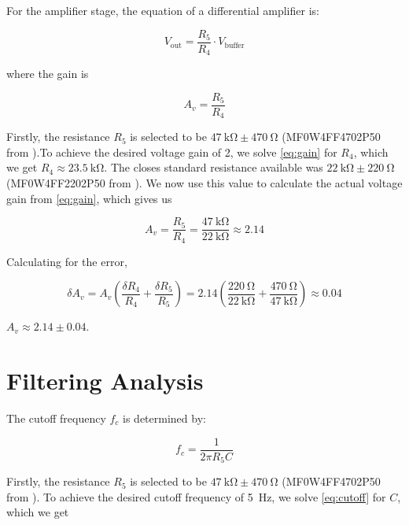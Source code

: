 \documentclass[12pt,a4paper]{article}
\begin{document}
For the amplifier stage, the equation of a differential amplifier is:

\begin{equation}
    V_\text{out} = \frac{R_5}{R_4} \cdot V_\text{buffer}
    \label{eq:vout-to-vbuffer}
\end{equation}

where the gain is

\begin{equation}
    A_v= \frac{R_5}{R_4}
    \label{eq:gain}
\end{equation}

Firstly, the resistance $R_5$ is selected to be $\SI{47}{\kilo\ohm}\pm\SI{470}{\ohm}$ (MF0W4FF4702P50 from \cite{resistor}).To achieve the desired voltage gain of 2, we solve \eqref{eq:gain} for $R_4$, which we get $R_4\approx\SI{23.5}{\kilo\ohm}$. The closes standard resistance available was $\SI{22}{\kilo\ohm}\pm\SI{220}{\ohm}$ (MF0W4FF2202P50 from \cite{resistor}). We now use this value to calculate the actual voltage gain from \eqref{eq:gain}, which gives us 

\begin{equation*}
    A_v= \frac{R_5}{R_4} = \frac{\SI{47}{\kilo\ohm}}{\SI{22}{\kilo\ohm}} \approx 2.14 
\end{equation*}

Calculating for the error,

\begin{equation*}
    \delta A_v = A_v (\frac{\delta R_4}{R_4} + \frac{\delta R_5}{R_5}) = 2.14 (\frac{\SI{220}{\ohm}}{\SI{22}{\kilo\ohm}} + \frac{\SI{470}{\ohm}}{\SI{47}{\kilo\ohm}}) \approx 0.04
\end{equation*}

$A_v\approx 2.14 \pm 0.04$.

\section{Filtering Analysis}
\label{sec:filter}
The cutoff frequency $f_c$ is determined by:

\begin{equation}
    f_c = \frac{1}{2 \pi R_5 C}
    \label{eq:cutoff}
\end{equation}

Firstly, the resistance $R_5$ is selected to be $\SI{47}{\kilo\ohm}\pm\SI{470}{\ohm}$ (MF0W4FF4702P50 from \cite{resistor}). To achieve the desired cutoff frequency of \SI{5}{Hz}, we solve \eqref{eq:cutoff} for $C$, which we get 
\end{document}
